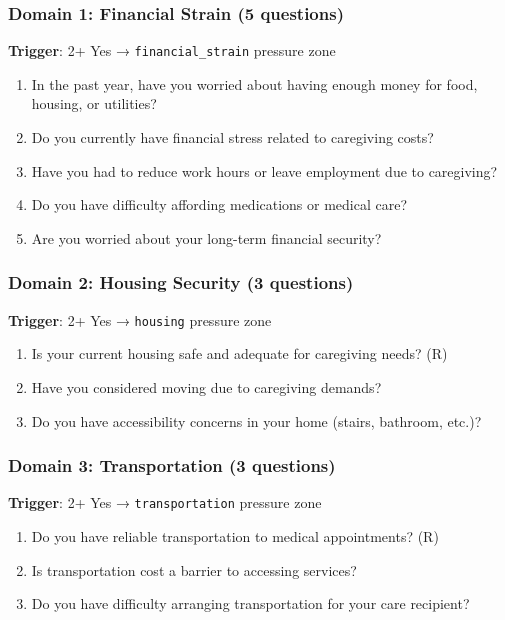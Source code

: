 \documentclass[
]{article}
\providecommand{\tightlist}{%
  \setlength{\itemsep}{0pt}\setlength{\parskip}{0pt}}
\begin{document}
\subsubsection{Domain 1: Financial Strain (5
questions)}\label{domain-1-financial-strain-5-questions}

\textbf{Trigger}: 2+ Yes → \texttt{financial\_strain} pressure zone

\begin{enumerate}
\def\labelenumi{\arabic{enumi}.}
\tightlist
\item
  In the past year, have you worried about having enough money for food,
  housing, or utilities?
\item
  Do you currently have financial stress related to caregiving costs?
\item
  Have you had to reduce work hours or leave employment due to
  caregiving?
\item
  Do you have difficulty affording medications or medical care?
\item
  Are you worried about your long-term financial security?
\end{enumerate}

\subsubsection{Domain 2: Housing Security (3
questions)}\label{domain-2-housing-security-3-questions}

\textbf{Trigger}: 2+ Yes → \texttt{housing} pressure zone

\begin{enumerate}
\def\labelenumi{\arabic{enumi}.}
\setcounter{enumi}{5}
\tightlist
\item
  Is your current housing safe and adequate for caregiving needs? (R)
\item
  Have you considered moving due to caregiving demands?
\item
  Do you have accessibility concerns in your home (stairs, bathroom,
  etc.)?
\end{enumerate}

\subsubsection{Domain 3: Transportation (3
questions)}\label{domain-3-transportation-3-questions}

\textbf{Trigger}: 2+ Yes → \texttt{transportation} pressure zone

\begin{enumerate}
\def\labelenumi{\arabic{enumi}.}
\setcounter{enumi}{8}
\tightlist
\item
  Do you have reliable transportation to medical appointments? (R)
\item
  Is transportation cost a barrier to accessing services?
\item
  Do you have difficulty arranging transportation for your care
  recipient?
\end{enumerate}
\end{document}
